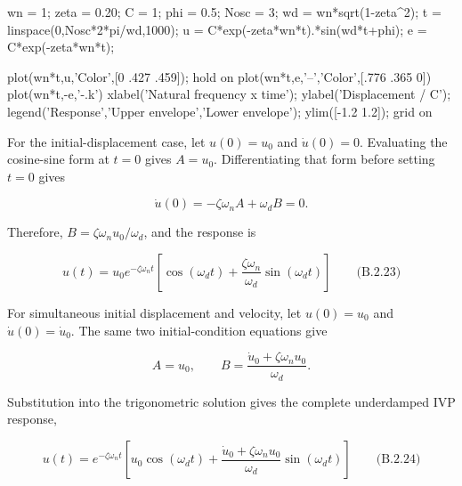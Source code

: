 \clearpage
{}

\begin{center}
\begin{matlabcode}
wn = 1; zeta = 0.20; C = 1; phi = 0.5; Nosc = 3;
wd = wn*sqrt(1-zeta^2);
t = linspace(0,Nosc*2*pi/wd,1000);
u = C*exp(-zeta*wn*t).*sin(wd*t+phi);
e = C*exp(-zeta*wn*t);

plot(wn*t,u,'Color',[0 .427 .459]); hold on
plot(wn*t,e,'--','Color',[.776 .365 0])
plot(wn*t,-e,'-.k')
xlabel('Natural frequency x time');
ylabel('Displacement / C');
legend('Response','Upper envelope','Lower envelope');
ylim([-1.2 1.2]); grid on
\end{matlabcode}
\end{center}

For the initial-displacement case, let $u(0)=u_0$ and $\dot{u}(0)=0$. Evaluating the cosine-sine form at $t=0$ gives $A=u_0$. Differentiating that form before setting $t=0$ gives

\[
\dot{u}(0)=-\zeta\omega_nA+\omega_dB=0.
\]

Therefore, $B=\zeta\omega_nu_0/\omega_d$, and the response is

\[
\boxed{u(t)=u_0e^{-\zeta\omega_nt}\left[\cos(\omega_dt)+\frac{\zeta\omega_n}{\omega_d}\sin(\omega_dt)\right]}
\qquad\text{(B.2.23)}
\]

For simultaneous initial displacement and velocity, let $u(0)=u_0$ and $\dot{u}(0)=\dot{u}_0$. The same two initial-condition equations give

\[
A=u_0,
\qquad
B=\frac{\dot{u}_0+\zeta\omega_nu_0}{\omega_d}.
\]

Substitution into the trigonometric solution gives the complete underdamped IVP response,

\[
\boxed{u(t)=e^{-\zeta\omega_nt}\left[u_0\cos(\omega_dt)+\frac{\dot{u}_0+\zeta\omega_nu_0}{\omega_d}\sin(\omega_dt)\right]}
\qquad\text{(B.2.24)}
\]

\endgroup
